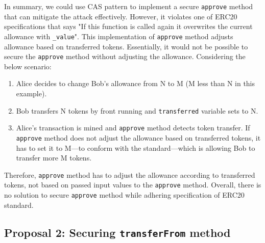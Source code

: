 In summary, we could use CAS pattern to implement a secure \texttt{approve} method that can mitigate the attack effectively. However, it violates one of ERC20 specifications that says "If this function is called again it overwrites the current allowance with \texttt{\_value}". This implementation of \texttt{approve} method adjusts allowance based on transferred tokens. Essentially, it would not be possible to secure the \texttt{approve} method without adjusting the allowance. Considering the below scenario:

\begin{enumerate}
	\item Alice decides to change Bob's allowance from N to M (M less than N in this example).
	\item Bob transfers N tokens by front running and \texttt{transferred} variable sets to N.
	\item Alice's transaction is mined and \texttt{approve} method detects token transfer. If \texttt{approve} method does not adjust the allowance based on transferred tokens, it has to set it to M---to conform with the standard---which is allowing Bob to transfer more M tokens.
\end{enumerate}
Therefore, \texttt{approve} method has to adjust the allowance according to transferred tokens, not based on passed input values to the \texttt{approve} method. Overall, there is no solution to secure \texttt{approve} method while adhering specification of ERC20 standard.

\subsection{Proposal 2: Securing \texttt{transferFrom} method}

